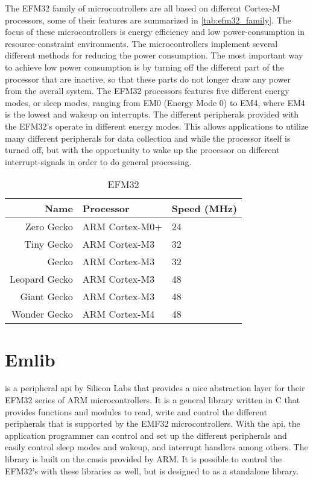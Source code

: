 The EFM32 family of microcontrollers are all based on different Cortex-M processors, some of their
features are summarized in \autoref{tab:efm32_family}.
The focus of these microcontrollers is energy efficiency and low power-consumption in resource-constraint environments.
The microcontrollers implement several different methods for reducing the power consumption.
The most important way to achieve low power consumption is by turning off the different part of the processor that are inactive, so that these parts do not longer draw any power from the overall system.
The EFM32 processors features five different energy modes, or sleep modes, ranging from EM0 (Energy Mode 0) to EM4, where EM4 is the lowest and wakeup on interrupts.
The different peripherals provided with the EFM32's operate in different energy modes.
This allows applications to utilize many different peripherals for data collection and  while the processor itself is turned off, but with the opportunity to wake up the processor on different interrupt-signals in order to do general processing.

\begin{table}
\begin{center}
\begin{tabular}{r|l|l}
\textbf{Name} & \textbf{Processor} & \textbf{Speed (MHz)} \\
\hline
Zero Gecko    & ARM Cortex-M0+ & 24 \\
Tiny Gecko    & ARM Cortex-M3  & 32 \\
Gecko         & ARM Cortex-M3  & 32 \\
Leopard Gecko & ARM Cortex-M3  & 48 \\
Giant Gecko   & ARM Cortex-M3  & 48 \\
Wonder Gecko  & ARM Cortex-M4  & 48 \\
\end{tabular}
\end{center}
\caption{EFM32}
\label{tab:efm32_family}
\end{table}



\section{Emlib} %
\label{sub:emlib}

\emlib is a peripheral \gls{api} by Silicon Labs that provides a nice abstraction layer for their EFM32 series of ARM microcontrollers.
It is a general library written in C that provides functions and modules to read, write and control the different peripherals that is supported by the EMF32 microcontrollers.
With the \gls{api}, the application programmer can control and set up the different peripherals and easily control sleep modes and wakeup, and interrupt handlers among others.
The library is built on the \gls{cmsis} provided by ARM.
It is possible to control the EFM32's with these libraries as well, but \emlib is designed to as a standalone library.
